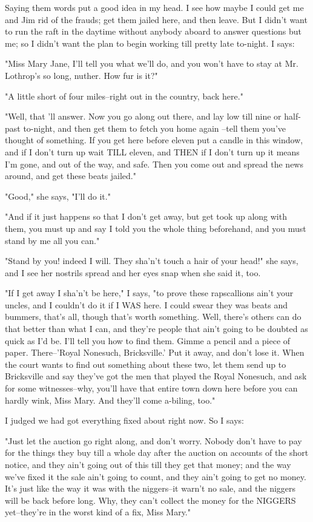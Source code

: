 Saying them words put a good idea in my head.  I see how maybe I could
get me and Jim rid of the frauds; get them jailed here, and then leave.
But I didn't want to run the raft in the daytime without anybody aboard
to answer questions but me; so I didn't want the plan to begin working
till pretty late to-night.  I says:

"Miss Mary Jane, I'll tell you what we'll do, and you won't have to stay
at Mr. Lothrop's so long, nuther.  How fur is it?"

"A little short of four miles--right out in the country, back here."

"Well, that 'll answer.  Now you go along out there, and lay low till
nine or half-past to-night, and then get them to fetch you home again
--tell them you've thought of something.  If you get here before eleven put
a candle in this window, and if I don't turn up wait TILL eleven, and
THEN if I don't turn up it means I'm gone, and out of the way, and safe.
Then you come out and spread the news around, and get these beats
jailed."

"Good," she says, "I'll do it."

"And if it just happens so that I don't get away, but get took up along
with them, you must up and say I told you the whole thing beforehand, and
you must stand by me all you can."

"Stand by you! indeed I will.  They sha'n't touch a hair of your head!"
she says, and I see her nostrils spread and her eyes snap when she said
it, too.

"If I get away I sha'n't be here," I says, "to prove these rapscallions
ain't your uncles, and I couldn't do it if I WAS here.  I could swear
they was beats and bummers, that's all, though that's worth something.
Well, there's others can do that better than what I can, and they're
people that ain't going to be doubted as quick as I'd be.  I'll tell you
how to find them.  Gimme a pencil and a piece of paper.  There--'Royal
Nonesuch, Bricksville.'  Put it away, and don't lose it.  When the court
wants to find out something about these two, let them send up to
Bricksville and say they've got the men that played the Royal Nonesuch,
and ask for some witnesses--why, you'll have that entire town down here
before you can hardly wink, Miss Mary.  And they'll come a-biling, too."

I judged we had got everything fixed about right now.  So I says:

"Just let the auction go right along, and don't worry.  Nobody don't have
to pay for the things they buy till a whole day after the auction on
accounts of the short notice, and they ain't going out of this till they
get that money; and the way we've fixed it the sale ain't going to count,
and they ain't going to get no money.  It's just like the way it was with
the niggers--it warn't no sale, and the niggers will be back before
long.  Why, they can't collect the money for the NIGGERS yet--they're in
the worst kind of a fix, Miss Mary."

